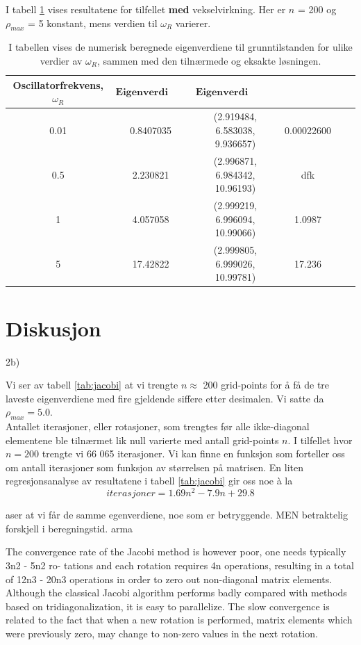 \documentclass{article}
\begin{document}
I tabell \ref{tab:jacobi_interact} vises resultatene for tilfellet \textbf{med} vekselvirkning. Her er $n$ = 200 og $\rho_{max}$ = 5 konstant, mens verdien til $\omega_R$ varierer. 

\FloatBarrier
\begin{table}[!ht]
\centering
\caption{I tabellen vises de numerisk beregnede eigenverdiene til grunntilstanden for ulike verdier av $\omega_R$, sammen med den tilnærmede og eksakte løsningen.}
\label{tab:jacobi_interact}
\begin{tabular}{|c|c|c|c|c|c|}
\hline
\textbf{Oscillatorfrekvens, $\omega$}$_R$      &  $\textbf{Eigenverdi (numerisk)}$ &$\textbf{Eigenverdi (analytisk) }$ \\ 
\hline
0.01     & 0.8407035  & (2.919484,   6.583038,   9.936657)   & 0.00022600     \\ 
\hline
0.5 & 2.230821 &(2.996871, 6.984342, 10.96193)    & dfk             \\ 
\hline
1 & 4.057058 & (2.999219, 6.996094, 10.99066)      & 1.0987        \\ 
\hline
5 & 17.42822 & (2.999805, 6.999026, 10.99781)      & 17.236    \\ 
\hline   
\end{tabular}
\end{table}
\FloatBarrier

\section{Diskusjon}
2b)

Vi ser av tabell \ref{tab:jacobi} at vi trengte $n \approx$ 200 grid-points for å få de tre laveste eigenverdiene med fire gjeldende siffere etter desimalen. Vi satte da $\rho_{max} = 5.0$.\\

Antallet iterasjoner, eller rotasjoner, som trengtes før alle ikke-diagonal elementene ble tilnærmet lik null varierte med antall grid-points $n$. I tilfellet hvor $n = 200$ trengte vi 66 065 iterasjoner. Vi kan finne en funksjon som forteller oss om antall iterasjoner som funksjon av størrelsen på matrisen. En liten regresjonsanalyse av resultatene i tabell \ref{tab:jacobi} gir oss noe à la
\[ iterasjoner = 1.69n^2 - 7.9n + 29.8 \] 

aser at vi får de samme egenverdiene, noe som er betryggende. MEN betraktelig forskjell i beregningstid. arma

The convergence rate of the Jacobi method is however poor, one needs typically 3n2 - 5n2 ro- tations and each rotation requires 4n operations, resulting in a total of 12n3 - 20n3 operations in order to zero out non-diagonal matrix elements. Although the classical Jacobi algorithm performs badly compared with methods based on tridiagonalization, it is easy to parallelize.
The slow convergence is related to the fact that when a new rotation is performed, matrix elements which were previously zero, may change to non-zero values in the next rotation.
\end{document}
